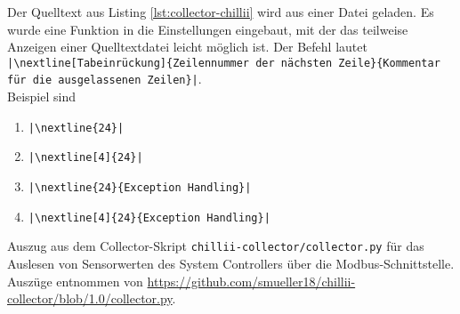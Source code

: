 Der Quelltext aus Listing \ref{lst:collector-chillii} wird aus einer Datei geladen. Es wurde eine Funktion in die Einstellungen eingebaut, mit der das teilweise Anzeigen einer Quelltextdatei leicht möglich ist. Der Befehl lautet\\
\texttt{\scriptsize |\textbackslash nextline[Tabeinrückung]\{Zeilennummer der nächsten Zeile\}\{Kommentar für die ausgelassenen Zeilen\}|}.\\
Beispiel sind
\begin{enumerate} \footnotesize
  \item \texttt{|\textbackslash nextline\{24\}|}
  \item \texttt{|\textbackslash nextline[4]\{24\}|}
  \item \texttt{|\textbackslash nextline\{24\}\{Exception Handling\}|}
  \item \texttt{|\textbackslash nextline[4]\{24\}\{Exception Handling\}|}
\end{enumerate}




\begin{code}
  
  \caption[Collector-Skript für den System Controller]{Auszug aus dem Collector-Skript \texttt{chillii-collector/collector.py} für das Auslesen von Sensorwerten des System Controllers über die Modbus-Schnittstelle. Auszüge entnommen von \url{https://github.com/smueller18/chillii-collector/blob/1.0/collector.py}.}
  \label{lst:collector-chillii}
\end{code}
